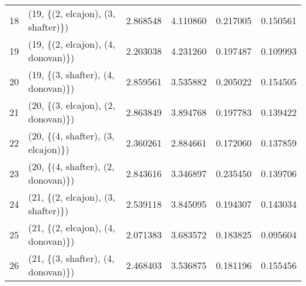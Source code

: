 \begin{tabular}{llrrrr}
18 &  (19, \{(2, elcajon), (3, shafter)\}) &  2.868548 &  4.110860 &   0.217005 &  0.150561 \\
19 &  (19, \{(2, elcajon), (4, donovan)\}) &  2.203038 &  4.231260 &   0.197487 &  0.109993 \\
20 &  (19, \{(3, shafter), (4, donovan)\}) &  2.859561 &  3.535882 &   0.205022 &  0.154505 \\
21 &  (20, \{(3, elcajon), (2, donovan)\}) &  2.863849 &  3.894768 &   0.197783 &  0.139422 \\
22 &  (20, \{(4, shafter), (3, elcajon)\}) &  2.360261 &  2.884661 &   0.172060 &  0.137859 \\
23 &  (20, \{(4, shafter), (2, donovan)\}) &  2.843616 &  3.346897 &   0.235450 &  0.139706 \\
24 &  (21, \{(2, elcajon), (3, shafter)\}) &  2.539118 &  3.845095 &   0.194307 &  0.143034 \\
25 &  (21, \{(2, elcajon), (4, donovan)\}) &  2.071383 &  3.683572 &   0.183825 &  0.095604 \\
26 &  (21, \{(3, shafter), (4, donovan)\}) &  2.468403 &  3.536875 &   0.181196 &  0.155456 \\
\bottomrule
\end{tabular}
